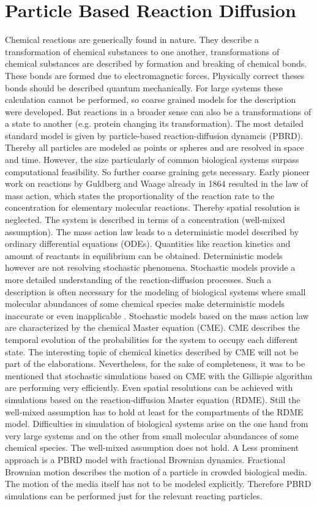 \documentclass[
  a4paper,BCOR10mm,oneside,
  headsepline,footsepline,%
  fleqn,openbib
]{scrbook}
\begin{document}
\chapter{Particle Based Reaction Diffusion }
Chemical reactions are generically found in nature. They describe a transformation of chemical substances to one another, transformations of chemical substances are described by formation and breaking of chemical bonds. These bonds are formed due to electromagnetic forces. Physically correct theses bonds should be described quantum mechanically. For large systems these calculation cannot be performed, so coarse grained models for the description were developed. But reactions in a broader sense can also be a transformations of a state to another (e.g. protein changing its transformation). The most detailed standard model is given by particle-based reaction-diffusion dynamcis (PBRD). Thereby all particles are modeled as points or spheres and are resolved in space and time. However, the size particularly of common biological systems surpass computational feasibility. So further coarse graining gets necessary. Early pioneer work on reactions by Guldberg and Waage already in 1864 \cite{Waage1986} resulted in the law of mass action, which states the proportionality of the reaction rate to the concentration for elementary molecular reactions. Thereby spatial resolution is neglected. The system is described in terms of a concentration (well-mixed assumption). The mass action law leads to a deterministic model described by ordinary differential equations (ODEs). Quantities like reaction kinetics and amount of reactants in equilibrium can be obtained. Deterministic models however are not resolving stochastic phenomena. Stochastic models provide a more detailed understanding of the reaction-diffusion processes. Such a description is often necessary for the modeling of biological systems where small molecular abundances of some chemical species make deterministic models inaccurate or even inapplicable \cite{0704.1908}. Stochastic models based on the mass action law are characterized by the chemical Master equation (CME). CME describes the temporal evolution of the probabilities for the system to occupy each different state. The interesting topic of chemical kinetics described by CME will not be part of the elaborations. Nevertheless, for the sake of completeness, it was to be mentioned that stochastic simulations based on CME with the Gillispie algorithm \cite{Gillespie1977} are performing very efficiently. Even spatial resolutions can be achieved with simulations based on the reaction-diffusion Master equation (RDME). Still the well-mixed assumption has to hold at least for the compartments of the RDME model. Difficulties in simulation of biological systems arise on the one hand from very large systems and on the other from small molecular abundances of some chemical species. The well-mixed assumption does not hold. A Less prominent approach is a PBRD model with fractional Brownian dynamics. Fractional Brownian motion describes the motion of a particle in crowded biological media. The motion of the media itself has not to be modeled explicitly. Therefore PBRD simulations can be performed just for the relevant reacting particles. 
\end{document}
